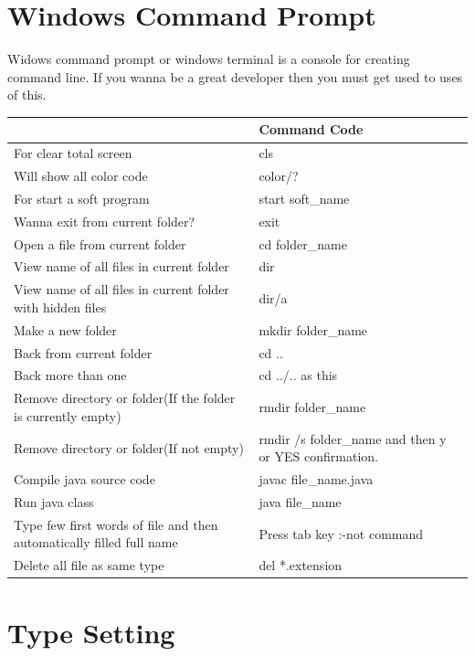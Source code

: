 \documentclass[10 pt]{book}
\begin{document}
\begin{enumerate}
\chapter{Windows Command Prompt}
Widows command prompt or windows terminal is a console for creating command line. If you wanna be a great developer then you must get used to uses of this.\\
\begin{center}
	\begin{tabularx}{0.9\textwidth}
	{|>{\raggedright\arraybackslash}X
	 |>{\raggedleft\arraybackslash}X	
	|}
		\hline
		{\color{red}Task}& {\color{red}Command Code}\\
		\hline
		\hline
		For clear total screen & cls\\
		\hline
		Will show all color code & color/?\\
		\hline
		For start a soft program & start soft\_name\\
		\hline
		Wanna exit from current folder? & exit\\
		\hline
		Open a file from current folder & cd folder\_name\\
		\hline
		View name of all files in current folder & dir\\
		\hline
		View name of all files in current folder with hidden files & dir/a\\
		\hline
		Make a new folder & mkdir folder\_name\\
		\hline
		Back from current folder & cd ..\\
		\hline
		Back more than one & cd ../.. as this\\
		\hline
		Remove directory or folder(If the folder is currently empty) & rmdir folder\_name\\
		\hline
		Remove directory or folder(If not empty) & rmdir /s folder\_name and then y or YES confirmation.\\
		\hline
		Compile java source code & javac file\_name.java\\
		\hline
		Run java class & java file\_name\\
		\hline
		Type few first words of file and then automatically filled full name & Press tab key :-not command\\
		\hline
		Delete all file as same type & del *.extension\\
		\hline
		
	\end{tabularx}
\end{center}

\chapter{Type Setting}

\end{enumerate}
\end{document}
